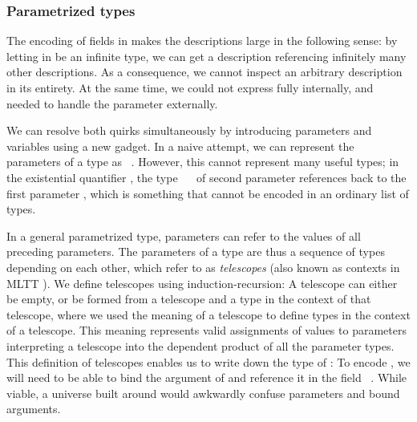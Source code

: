 \subsubsection{Parametrized types}\label{ssec:background-par}
The encoding of fields in  makes the descriptions large in the following sense: by letting  in  be an infinite type, we can get a description referencing infinitely many other descriptions. As a consequence, we cannot inspect an arbitrary description in its entirety. At the same time, we could not express  fully internally, and needed to handle the parameter externally. 

We can resolve both quirks simultaneously by introducing parameters and variables using a new gadget. In a naive attempt, we can represent the parameters of a type as \ . However, this cannot represent many useful types; in the existential quantifier , the type \ \  of second parameter  references back to the first parameter , which is something that cannot be encoded in an ordinary list of types.

In a general parametrized type, parameters can refer to the values of all preceding parameters. The parameters of a type are thus a sequence of types depending on each other, which refer to as \emph{telescopes} \cite{telescopes} (also known as contexts in MLTT \cite{mltt}). We define telescopes using induction-recursion:
A telescope can either be empty, or be formed from a telescope and a type in the context of that telescope, where we used the meaning of a telescope  to define types in the context of a telescope. This meaning represents valid assignments of values to parameters
interpreting a telescope into the dependent product of all the parameter types. This definition of telescopes enables us to write down the type of :
To encode , we will need to be able to bind the argument  of  and reference it in the field \ . While viable, a universe built around  would awkwardly confuse parameters and bound arguments.

